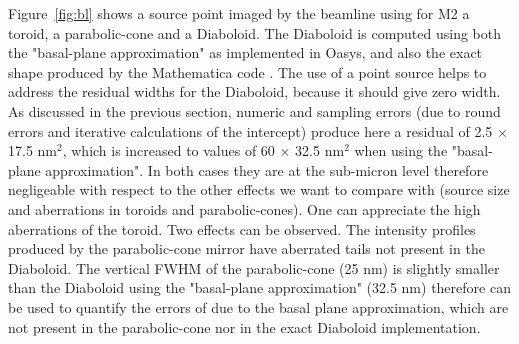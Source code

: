 \documentclass{iucr}              %
\begin{document}
Figure~\ref{fig:bl} shows a source point imaged by the beamline using for M2 a toroid, a parabolic-cone and a Diaboloid. The Diaboloid is computed using both the "basal-plane approximation" as implemented in Oasys, and also the exact shape produced by the Mathematica code \cite{lacey}. The use of a point source helps to address the residual widths for the Diaboloid, because it should give zero width. As discussed in the previous section, numeric and sampling errors (due to round errors and iterative calculations of the intercept) produce here a residual of 2.5 $\times$ 17.5 nm$^2$, which is increased to values of 60 $\times$ 32.5 nm$^2$ when using the "basal-plane approximation". In both cases they are at the sub-micron level therefore negligeable with respect to the other effects we want to compare with (source size and aberrations in toroids and parabolic-cones). One can appreciate the high aberrations of the toroid. Two effects can be observed. The intensity profiles produced by the parabolic-cone mirror have aberrated tails not present in the Diaboloid. The vertical FWHM of the parabolic-cone (25 nm) is slightly smaller than the Diaboloid using the "basal-plane approximation" (32.5 nm) therefore can be used to quantify the errors of due to the basal plane approximation, which are not present in the parabolic-cone nor in the exact Diaboloid implementation. 
\end{document}
